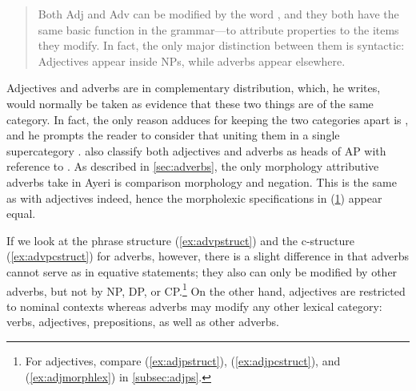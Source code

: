 \blockcquote[51]{carnie2013}{Both Adj and Adv can be modified by the word
, and they both have the same basic function in the grammar---to
attribute properties to the items they modify. In fact, the only major
distinction between them is syntactic: Adjectives appear inside NPs, while
adverbs appear elsewhere.}

Adjectives and adverbs are in complementary distribution, which, he writes,
would normally be taken as evidence that these two things are of the same
category. In fact, the only reason \citet{carnie2013} adduces for keeping the
two categories apart is ,
and he prompts the reader to consider that uniting them in a single
supercategory . \citet[126]{bresnan2016} also
classify both adjectives and adverbs as heads of AP with reference to
\citet{emonds1976}. As described in \autoref{sec:adverbs}, the only morphology
attributive adverbs take in Ayeri is comparison morphology and negation. This
is the same as with adjectives indeed, hence the morpholexic specifications
in (\ref{ex:advmorphlex}) appear equal.

\begin{figure}[h]
\begin{morphlex}
\ex\label{ex:advmorphlex}%
\xe
\end{morphlex}
\end{figure}

If we look at the phrase structure (\ref{ex:advpstruct}) and the c-structure
(\ref{ex:advpcstruct}) for adverbs, however, there is a slight difference in
that adverbs cannot serve as \XCompl{} in equative statements; they also can
only be modified by other adverbs, but not by  NP, DP, or CP.\footnote{For
adjectives, compare (\ref{ex:adjpstruct}), (\ref{ex:adjpcstruct}), and
(\ref{ex:adjmorphlex}) in \autoref{subsec:adjps}.} On the other hand,
adjectives are restricted to nominal contexts whereas adverbs may modify any
other lexical category: verbs, adjectives, prepositions, as well as other
adverbs.

